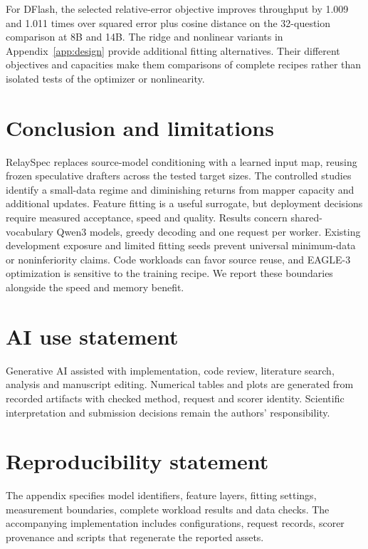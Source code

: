 \documentclass{article}
\begin{document}
For DFlash, the selected relative-error objective improves throughput
by 1.009 and 1.011 times over squared error plus cosine distance on the
32-question comparison at 8B and 14B. The ridge and nonlinear variants
in Appendix~\ref{app:design} provide additional fitting alternatives.
Their different objectives and capacities make them comparisons of
complete recipes rather than isolated tests of the optimizer or
nonlinearity.

\section{Conclusion and limitations}
\label{sec:scope}
RelaySpec replaces source-model conditioning with a learned input map,
reusing frozen speculative drafters across the tested target sizes.
The controlled studies identify a small-data regime and diminishing
returns from mapper capacity and additional updates. Feature fitting
is a useful surrogate, but deployment decisions require measured
acceptance, speed and quality. Results concern shared-vocabulary Qwen3
models, greedy decoding and one request per worker. Existing development
exposure and limited fitting seeds prevent universal minimum-data or
noninferiority claims. Code workloads can favor source reuse, and
EAGLE-3 optimization is sensitive to the training recipe. We report these
boundaries alongside the speed and memory benefit.

\label{maintextend}
\section*{AI use statement}
Generative AI assisted with implementation, code review, literature search,
analysis and manuscript editing. Numerical tables and plots are generated
from recorded artifacts with checked method, request and scorer identity.
Scientific interpretation and submission decisions remain the authors'
responsibility.

\section*{Reproducibility statement}
The appendix specifies model identifiers, feature layers, fitting settings,
measurement boundaries, complete workload results and data checks.
The accompanying implementation includes configurations, request records,
scorer provenance and scripts that regenerate the reported assets.



\clearpage
\appendix
\raggedbottom
\end{document}
